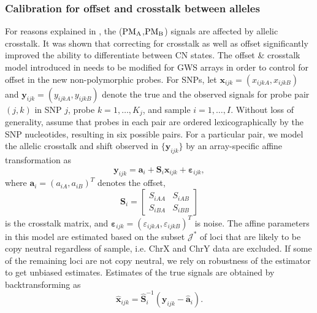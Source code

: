 \documentclass{bioinfo}
\newcommand{\GWS}{GWS\xspace}
\newcommand{\GWSFive}{GWS5\xspace}
\newcommand{\PMA}{\ensuremath{\textnormal{PM}_\textnormal{A}}\xspace}
\newcommand{\PMB}{\ensuremath{\textnormal{PM}_\textnormal{B}}\xspace}
\newcommand{\bx}{\mathbf{x}\xspace}
\newcommand{\by}{\mathbf{y}\xspace}
\newcommand{\ba}{\mathbf{a}\xspace}
\newcommand{\bS}{\mathbf{S}\xspace}
\newcommand{\beps}{\bm{\varepsilon}\xspace}
\begin{document}
\subsubsection{Calibration for offset and crosstalk between alleles}
\label{secModelACC}
For reasons explained in \citet{BengtssonH_etal_2008a}, the (\PMA,\PMB) signals are affected by allelic crosstalk.  It was shown that correcting for crosstalk as well as offset significantly improved the ability to differentiate between CN states.
The offset \& crosstalk model introduced in \citet{BengtssonH_etal_2008a} needs to be modified for \GWS arrays in order to control for offset in the new non-polymorphic probes.  
For SNPs, let $\bx_{ijk} = (x_{ijkA}, x_{ijkB})$ and $\by_{ijk} = (y_{ijkA}, y_{ijkB})$ denote the true and the observed signals for probe pair $(j,k)$ in SNP $j$, probe $k=1,\ldots,K_j$, and sample $i=1,\ldots,I$.  
Without loss of generality, assume that probes in each pair are ordered lexicographically by the SNP nucleotides, resulting in six possible pairs.  For a particular pair, we model the allelic crosstalk and shift observed in $\{\by_{ijk}\}$ by an array-specific affine transformation as
\begin{equation}
  \by_{ijk} = \ba_i + \bS_i \bx_{ijk} + \beps_{ijk},
  \label{eqnACCi}
\end{equation}
where $\ba_i = (a_{iA}, a_{iB})^T$ denotes the offset, 
\begin{equation}
 \bS_i = 
 \begin{bmatrix}
   S_{iAA} & S_{iAB} \\
   S_{iBA} & S_{iBB}
 \end{bmatrix}
  \label{eqnACCii}
\end{equation}
is the crosstalk matrix, and $\beps_{ijk} = (\varepsilon_{ijkA}, \varepsilon_{ijkB})^T$ is noise.  The affine parameters in this model are estimated based on the subset $\mathcal{J^*}$ of loci that are likely to be copy neutral regardless of sample, i.e. ChrX and ChrY data are excluded.  If some of the remaining loci are not copy neutral, we rely on robustness of the estimator to get unbiased estimates.
Estimates of the true signals
are obtained by backtransforming as
\begin{equation}
  \hat{\bx}_{ijk} = \hat{\bS}^{-1}_i (\by_{ijk} - \hat{\ba}_i).
  \label{eqnACCiii}
\end{equation}
\end{document}
